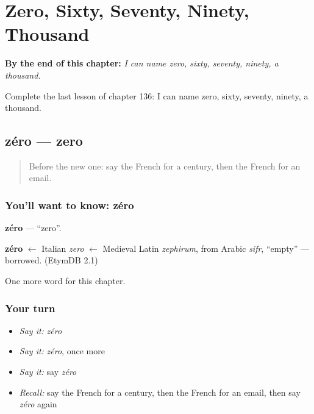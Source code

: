 
\chapter{Zero, Sixty, Seventy, Ninety, Thousand}
\label{ch:fr-zero-sixty-seventy-ninety-thousand}

\begin{chapteropening}
\textbf{By the end of this chapter:} \emph{I can name zero, sixty, seventy, ninety, a thousand.}

Complete the last lesson of chapter 136: I can name zero, sixty, seventy, ninety, a thousand.
\end{chapteropening}

\section[zéro]{zéro — zero}

\label{lesson:FR-C136-zero}



\begin{quote}
Before the new one: say the French for a century, then the French for an email.
\end{quote}

\subsection*{You'll want to know: zéro}
\textbf{zéro} — \textquotedblleft{}zero\textquotedblright{}.

\begin{cousinweb}
\textbf{zéro} $\leftarrow$ Italian \emph{zero} $\leftarrow$ Medieval Latin \emph{zephirum}, from Arabic \emph{sifr}, \textquotedblleft{}empty\textquotedblright{} — borrowed. (EtymDB 2.1)
\end{cousinweb}

\begin{grammarlens}[title={What you've built}]
One more word for this chapter.
\end{grammarlens}

\subsection*{Your turn}
\begin{itemize}
\raggedright
  \item \emph{Say it:} \emph{zéro}
  \item \emph{Say it:} \emph{zéro}, once more
  \item \emph{Say it:} say \emph{zéro}
  \item \emph{Recall:} say the French for a century, then the French for an email, then say \emph{zéro} again
\end{itemize}


